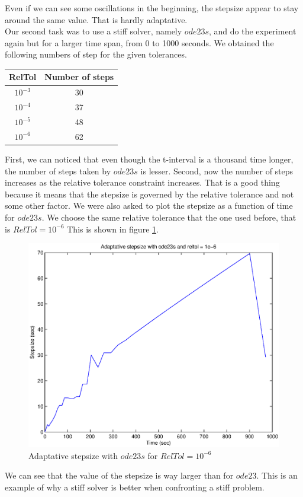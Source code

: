 Even if we can see some oscillations in the beginning, the stepsize appear to stay around the same value. That is hardly adaptative.\\

Our second task was to use a stiff solver, namely $ode23s$, and do the experiment again but for a larger time span, from 0 to 1000 seconds. We obtained the following numbers of step for the given tolerances.

\begin{center}
\begin{tabular}{|c|c|}
\hline 
\textbf{RelTol} & \textbf{Number of steps} \\ 
\hline 
$10^{-3}$ & 30 \\ 
\hline 
$10^{-4}$ & 37 \\ 
\hline 
$10^{-5}$ & 48 \\ 
\hline 
$10^{-6}$ & 62 \\ 
\hline 
\end{tabular} 
\end{center}

First, we can noticed that even though the t-interval is a thousand time longer, the number of steps taken by $ode23s$ is lesser. Second, now the number of steps increases as the relative tolerance constraint increases. That is a good thing because it means that the stepsize is governed by the relative tolerance and not some other factor. We were also asked to plot the stepsize as a function of time for $ode23s$. We choose the same relative tolerance that the one used before, that is $RelTol = 10^{-6}$ This is shown in figure \ref{step2}.

\begin{figure}
\begin{center}
\includegraphics[scale=0.5]{step2.eps}
\caption{Adaptative stepsize with $ode23s$ for $RelTol = 10^{-6}$}
\label{step2}
\end{center}
\end{figure}

We can see that the value of the stepsize is way larger than for $ode23$. This is an example of why a stiff solver is better when confronting a stiff problem.


